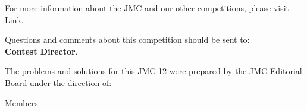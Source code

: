 \documentclass[10pt, twoside]{article}
\newcommand{\contestName}{JMC}
\newcommand{\contestNumber}{12}
\begin{document}
\begin{justify}
\begin{center}
\begin{itemize}[noitemsep, nolistsep, leftmargin=*]
\end{itemize}
\end{center}
\vspace{-7mm}
\begin{center} \noindent\hrulefill \end{center}
\vspace{-6mm}
\begin{center}
For more information about the {\contestName} and our other competitions, please visit \url{Link}.
\end{center}
\vspace{-5mm}
\begin{center} Questions and comments about this competition should be sent to:  
\vspace{4mm}
\\ \textbf{Contest Director}.\end{center}
\begin{center}The problems and solutions for this {\contestName} {\contestNumber} were prepared by the {\contestName} Editorial Board under the direction of:\end{center}
\vspace{-5mm}
\begin{center}
Members \end{center}
\end{justify}
\end{document}
